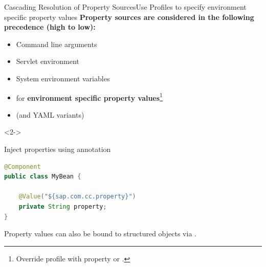 \begin{frame}[fragile]{Cascading Resolution of Property Sources}{Use Profiles to specify environment specific property values}
\footnotesize
\textbf{Property sources are considered in the following precedence (high to low):}
\begin{itemize}
	\item Command line arguments
	\item Servlet environment
	\item System environment variables
	\item {} for \textbf{environment specific property values}\footnote{\scriptsize Override  profile with  property or .}
	\item {} (and YAML variants)
\end{itemize}
\begin{visibleenv}<2->
\begin{block}{Inject properties using  annotation}
\begin{lstlisting}[language=java,belowskip=-4mm,aboveskip=-1mm]
@Component
public class MyBean {

    @Value("${sap.com.cc.property}")
    private String property;
}
\end{lstlisting}
\end{block}
Property values can also be bound to structured objects via .
\end{visibleenv}
\end{frame}



